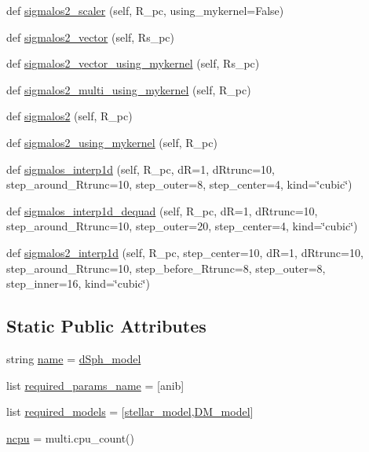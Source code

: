\begin{DoxyCompactItemize}
def \hyperlink{classdsph__model_1_1dSph__model_a05b988f7553121226a4d08369c44b4fa}{sigmalos2\+\_\+scaler} (self, R\+\_\+pc, using\+\_\+mykernel=False)
\item 
def \hyperlink{classdsph__model_1_1dSph__model_a5170edb309402dc101ea76871645e65f}{sigmalos2\+\_\+vector} (self, Rs\+\_\+pc)
\item 
def \hyperlink{classdsph__model_1_1dSph__model_a00cd796cf178fe8b3435e941976e8f27}{sigmalos2\+\_\+vector\+\_\+using\+\_\+mykernel} (self, Rs\+\_\+pc)
\item 
def \hyperlink{classdsph__model_1_1dSph__model_a0f0607e3d81520eb0c4c8b79dd871f0e}{sigmalos2\+\_\+multi\+\_\+using\+\_\+mykernel} (self, R\+\_\+pc)
\item 
def \hyperlink{classdsph__model_1_1dSph__model_a7b94850b439fe4afc431cfffa185d415}{sigmalos2} (self, R\+\_\+pc)
\item 
def \hyperlink{classdsph__model_1_1dSph__model_a4e062f0ac546057c1109fd47ec39ed90}{sigmalos2\+\_\+using\+\_\+mykernel} (self, R\+\_\+pc)
\item 
def \hyperlink{classdsph__model_1_1dSph__model_ad105b90e1827d25804eb3d7a3ba96f28}{sigmalos\+\_\+interp1d} (self, R\+\_\+pc, dR=1, d\+Rtrunc=10, step\+\_\+around\+\_\+\+Rtrunc=10, step\+\_\+outer=8, step\+\_\+center=4, kind=\char`\"{}cubic\char`\"{})
\item 
def \hyperlink{classdsph__model_1_1dSph__model_a239ec859750c30fe31b6c19e94cd2e33}{sigmalos\+\_\+interp1d\+\_\+dequad} (self, R\+\_\+pc, dR=1, d\+Rtrunc=10, step\+\_\+around\+\_\+\+Rtrunc=10, step\+\_\+outer=20, step\+\_\+center=4, kind=\char`\"{}cubic\char`\"{})
\item 
def \hyperlink{classdsph__model_1_1dSph__model_a855543fee6bd37d3b2e185c2b9dee49e}{sigmalos2\+\_\+interp1d} (self, R\+\_\+pc, step\+\_\+center=10, dR=1, d\+Rtrunc=10, step\+\_\+around\+\_\+\+Rtrunc=10, step\+\_\+before\+\_\+\+Rtrunc=8, step\+\_\+outer=8, step\+\_\+inner=16, kind=\char`\"{}cubic\char`\"{})
\end{DoxyCompactItemize}
\subsection*{Static Public Attributes}
\begin{DoxyCompactItemize}
\item 
string \hyperlink{classdsph__model_1_1dSph__model_a44e4805fa7304536056b19bd361c3d37}{name} = \textquotesingle{}\hyperlink{classdsph__model_1_1dSph__model}{d\+Sph\+\_\+model}\textquotesingle{}
\item 
list \hyperlink{classdsph__model_1_1dSph__model_a74f031f3929b9123b00121c1b02b8b71}{required\+\_\+params\+\_\+name} = \mbox{[}\textquotesingle{}anib\textquotesingle{}\mbox{]}
\item 
list \hyperlink{classdsph__model_1_1dSph__model_a7795b8e9d3d0dbf3cd5a4d618c30a6c0}{required\+\_\+models} = \mbox{[}\hyperlink{classdsph__model_1_1stellar__model}{stellar\+\_\+model},\hyperlink{classdsph__model_1_1DM__model}{D\+M\+\_\+model}\mbox{]}
\item 
\hyperlink{classdsph__model_1_1dSph__model_ab09f579bff6269075f5956a1c0a88bdc}{ncpu} = multi.\+cpu\+\_\+count()
\end{DoxyCompactItemize}
